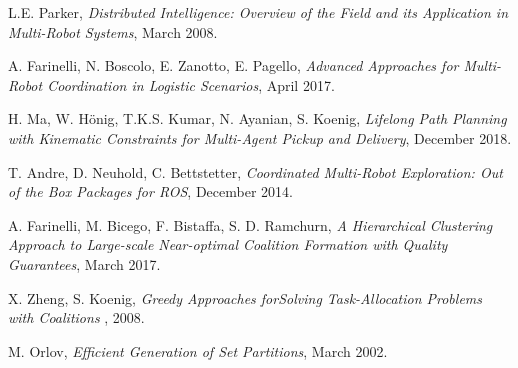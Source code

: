 \begin{thebibliography}{99}
     L.E. Parker, \emph{Distributed Intelligence: Overview of the Field and its
    Application in Multi-Robot Systems}, March 2008.

     A. Farinelli, N. Boscolo, E. Zanotto, E. Pagello,
    \emph{Advanced Approaches for Multi-Robot Coordination in
    Logistic Scenarios}, April 2017.

     H. Ma, W. Hönig, T.K.S. Kumar, N. Ayanian, S. Koenig,
    \emph{Lifelong Path Planning with Kinematic Constraints
    for Multi-Agent Pickup and Delivery}, December 2018.

     T. Andre, D. Neuhold, C. Bettstetter,
    \emph{Coordinated Multi-Robot Exploration:
    Out of the Box Packages for ROS}, December 2014.

     A. Farinelli, M. Bicego, F. Bistaffa, S. D. Ramchurn,
    \emph{A Hierarchical Clustering Approach to Large-scale
    Near-optimal Coalition Formation with Quality
    Guarantees}, March 2017.

     X. Zheng, S. Koenig,
    \emph{Greedy Approaches forSolving Task-Allocation Problems with Coalitions}
    , 2008.

     M. Orlov,
    \emph{Efficient Generation of Set Partitions}, March 2002.
    
\end{thebibliography}